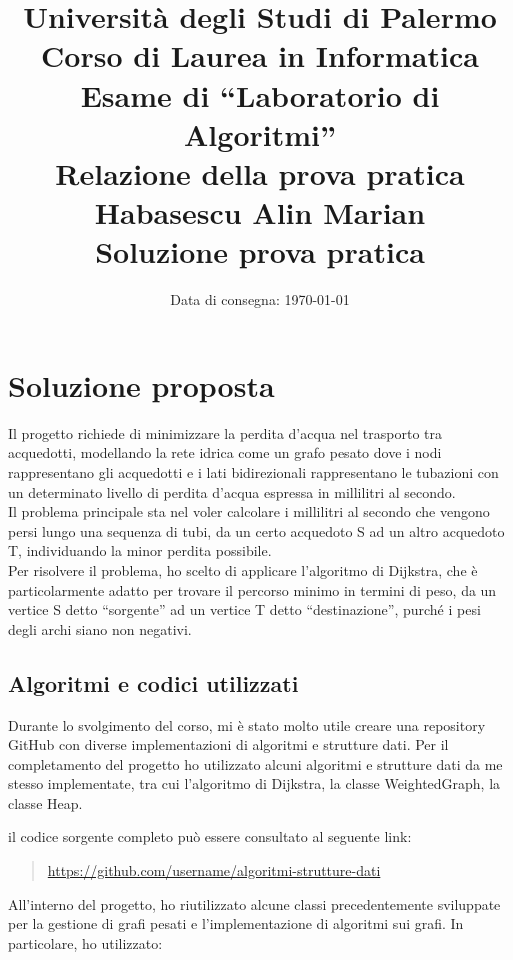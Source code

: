 \documentclass[a4paper,12pt]{article}
\title{
    \vspace{-2cm} %
    \textbf{\Large Università degli Studi di Palermo} \\
    \vspace{0.3cm}
    \textbf{\Large Corso di Laurea in Informatica} \\
    \vspace{1cm}
    \textbf{\Large Esame di ``Laboratorio di Algoritmi''} \\
    \vspace{0.5cm}
    \textbf{\Large Relazione della prova pratica} \\
    \vspace{2cm}
    \textbf{Habasescu Alin Marian} \\
    \vspace{0.5cm}
    \textbf{\Large Soluzione prova pratica} \\
    \vspace{1cm}
}
\date{\normalsize Data di consegna: \today} %
\begin{document}
\maketitle %

\tableofcontents %
\clearpage

\section{Soluzione proposta}
Il progetto richiede di minimizzare la perdita d'acqua nel trasporto tra acquedotti, 
modellando la rete idrica come un grafo pesato dove i nodi rappresentano gli acquedotti 
e i lati bidirezionali rappresentano le tubazioni con un determinato livello di perdita 
d'acqua espressa in millilitri al secondo. \\

Il problema principale sta nel voler calcolare i millilitri al secondo che vengono persi 
lungo una sequenza di tubi, da un certo acquedoto S ad un
altro acquedoto T, individuando la minor perdita possibile.\\

Per risolvere il problema, ho scelto di applicare l'algoritmo di Dijkstra, 
che è particolarmente adatto per trovare il percorso minimo in termini di peso,
da un vertice S detto ``sorgente'' ad un vertice T detto ``destinazione'', 
purché i pesi degli archi siano non negativi.\\

\subsection{Algoritmi e codici utilizzati}
Durante lo svolgimento del corso, mi è stato molto utile creare una repository GitHub
con diverse implementazioni di algoritmi e strutture dati. 
Per il completamento del progetto ho utilizzato alcuni algoritmi e strutture dati
da me stesso implementate, tra cui l'algoritmo di Dijkstra, la classe WeightedGraph,
la classe Heap. 

il codice sorgente completo può essere consultato al seguente link:

\begin{quote}
    \url{https://github.com/username/algoritmi-strutture-dati}
\end{quote}

All'interno del progetto, ho riutilizzato alcune classi precedentemente sviluppate 
per la gestione di grafi pesati e l'implementazione di algoritmi sui grafi. 
In particolare, ho utilizzato:
\end{document}
